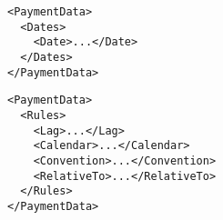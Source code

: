 \begin{listing}[H]
\begin{verbatim}
<PaymentData>
  <Dates>
    <Date>...</Date>
  </Dates>
</PaymentData>
\end{verbatim}
\caption{Dates based \lstinline!PaymentData!}
\label{lst:dates_payment_data}
\end{listing}

\begin{listing}[H]
\begin{verbatim}
<PaymentData>
  <Rules>
    <Lag>...</Lag>
    <Calendar>...</Calendar>
    <Convention>...</Convention>
    <RelativeTo>...</RelativeTo>
  </Rules>
</PaymentData>
\end{verbatim}
\caption{Rules based \lstinline!PaymentData!}
\label{lst:rules_payment_data}
\end{listing}

